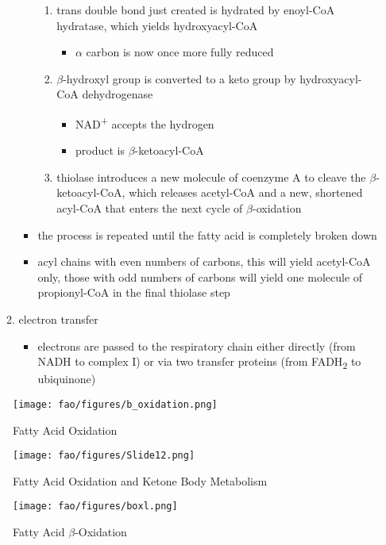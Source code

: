 \documentclass[12pt]{scrartcl}
\begin{document}
\begin{itemize}
\begin{enumerate}
\begin{itemize}
\begin{enumerate}
\item trans double bond just created is hydrated by enoyl-CoA
hydratase, which yields hydroxyacyl-CoA
\begin{itemize}
\item \(\alpha\) carbon is now once more fully reduced
\end{itemize}
\item \(\beta\)-hydroxyl group is converted to a keto group by
hydroxyacyl-CoA dehydrogenase
\begin{itemize}
\item NAD\textsuperscript{+} accepts the hydrogen
\item product is \(\beta\)-ketoacyl-CoA
\end{itemize}
\item thiolase introduces a new molecule of coenzyme A to cleave
the \(\beta\)-ketoacyl-CoA, which releases acetyl-CoA and a new,
shortened acyl-CoA that enters the next cycle of
\(\beta\)-oxidation
\end{enumerate}
\item the process is repeated until the fatty acid is completely
broken down
\item acyl chains with even numbers of carbons, this will yield
acetyl-CoA only, those with odd numbers of carbons will yield
one molecule of propionyl-CoA in the final thiolase step
\end{itemize}
\item electron transfer
\begin{itemize}
\item electrons are passed to the respiratory chain either directly
(from NADH to complex I) or via two transfer proteins (from
FADH\textsubscript{2} to ubiquinone)
\end{itemize}
\end{enumerate}
\end{itemize}

\begin{figure}[htbp]
\centering
\texttt{[image: fao/figures/b\_oxidation.png]}
\caption{\label{fig:org6cf1498}Fatty Acid Oxidation}
\end{figure}

\begin{figure}[htbp]
\centering
\texttt{[image: fao/figures/Slide12.png]}
\caption{\label{fig:orgdf960f1}Fatty Acid Oxidation and Ketone Body Metabolism}
\end{figure}


\begin{figure}[htbp]
\centering
\texttt{[image: fao/figures/boxl.png]}
\caption{\label{fig:org744553a}Fatty Acid \(\beta\)-Oxidation}
\end{figure}
\end{document}
